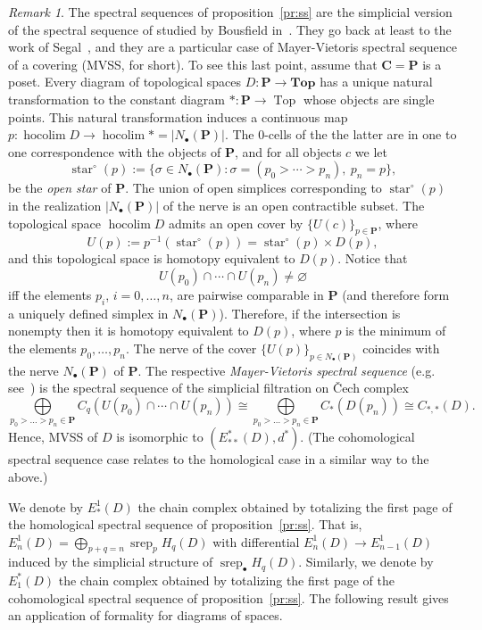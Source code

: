 \documentclass{amsart}
\theoremstyle{definition}
\theoremstyle{remark}
\newtheorem{remark}[formula]{Remark}
\newcommand{\lb}{\lbrace}
\newcommand{\rb}{\rbrace}
\DeclareMathOperator{\st}{star}
\DeclareMathOperator{\hoc}{hocolim}
\DeclareMathOperator{\Top}{Top}
\DeclareMathOperator{\srep}{srep}
\newcommand{\Cc}{\mathbf{C}}
\newcommand{\Pp}{\mathbf{P}}
\renewcommand{\top}{\mathbf{Top}}
\begin{document}
\begin{remark}
	The spectral sequences of proposition~\ref{pr:ss} are the simplicial version of the spectral sequence of studied by Bousfield in~\cite{bo-87}. They go back at least to the work of Segal~\cite{se-68}, and they are a particular case of Mayer-Vietoris spectral sequence of a covering (MVSS, for short).
	To see this last point, assume that $\Cc=\Pp$ is a poset. 
	Every diagram of topological spaces $D\colon\Pp\to \top$ has a unique natural transformation to the constant diagram $*\colon\Pp\to \Top$ whose objects are single points. This natural transformation induces a continuous map $p\colon \hoc D \to \hoc *=|N_\bullet(\Pp)|$. The $0$-cells of the the latter are in one to one correspondence with the objects of $\Pp$, and for all objects $c$ we let
	\[
		\st^{\circ}(p):=\lb \sigma\in N_{\bullet}(\Pp)\colon \sigma=(p_{0}> \cdots> p_{n}),\ p_{n}=p\rb,
	\]
	be the \textit{open star} of $\Pp$. 
	The union of open simplices corresponding to $\st^{\circ}(p)$ in the realization $|N_{\bullet}(\Pp)|$ of the nerve is an open contractible subset.
	The topological space $\hoc D$ admits an open cover by $\lb U(c)\rb_{p\in \Pp}$, where
	\[
		U(p):=p^{-1}(\st^{\circ}(p))=\st^{\circ}(p)\times D(p),
	\]
	and this topological space is homotopy equivalent to $D(p)$.
	Notice that
	\[
		U(p_{0})\cap\cdots \cap 	U(p_{n})\neq\varnothing
	\]
	iff the elements $p_{i}$, $i=0,\dots,n$, are pairwise comparable in $\Pp$ (and therefore form a uniquely defined simplex in $N_{\bullet}(\Pp)$).
	Therefore, if the intersection is nonempty then it is homotopy equivalent to $D(p)$, where $p$ is the minimum of the elements $p_{0},\dots,p_{n}$.
	The nerve of the cover $\lb U(p)\rb_{p\in N_{\bullet}(\Pp)}$ coincides with the nerve $N_{\bullet}(\Pp)$ of $\Pp$.
	The respective \textit{Mayer-Vietoris spectral sequence} (e.g. see~\cite[\S 8]{bo-tu-82}) is the spectral sequence of the simplicial filtration on \v{C}ech complex
	\[
		\bigoplus\limits_{p_{0}>\dots>p_{n}\in 	\Pp}C_{q}(U(p_{0})\cap\cdots \cap U(p_{n}))\cong 
		\bigoplus\limits_{p_{0}>\dots>p_{n}\in \Pp}C_{*}(D(p_{n}))\cong C_{*,*}(D).
	\]
	Hence, MVSS of $D$ is isomorphic to $(E^*_{**}(D), d^*)$.
	(The cohomological spectral sequence case relates to the homological case in a similar way to the above.)
\end{remark}

We denote by $E^1_*(D)$ the chain complex obtained by totalizing the first page of the homological spectral sequence of proposition~\ref{pr:ss}. That is, $E^1_n(D)=\bigoplus_{p+q=n}\srep_p H_q(D)$ with differential $E^1_n(D)\to E_{n-1}^1(D)$ induced by the simplicial structure of $\srep_\bullet H_q(D)$. Similarly, we denote by $E_1^*(D)$ the chain complex obtained by totalizing the first page of the cohomological spectral sequence of proposition~\ref{pr:ss}. The following result gives an application of formality for diagrams of spaces.
\end{document}
